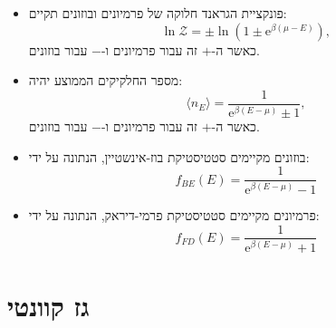 \documentclass{tstextbook}
\begin{document}
\begin{summary}
  \begin{itemize}
    \item פונקציית הגראנד חלוקה של פרמיונים ובוזונים תקיים:
$$\ln{\mathcal{Z}}=\pm\ln(1\pm\mathrm{e}^{\beta(\mu-E)}),$$
כאשר ה-\(+\) זה עבור פרמיונים ו-\(-\) עבור בוזונים.
    \item מספר החלקיקים הממוצע יהיה:
$$\langle n_{E}\rangle=\frac{1}{\mathrm{e}^{\beta(E-\mu)}\pm1},$$
כאשר ה-\(+\) זה עבור פרמיונים ו-\(-\) עבור בוזונים.
    \item בוזונים מקיימים סטטיסטיקת בוז-אינשטיין, הנתונה על ידי:
$$f_{BE}(E)=\frac{1}{\mathrm{e}^{\beta(E-\mu)}-1}$$
    \item פרמיונים מקיימים סטטיסטיקת פרמי-דיראק, הנתונה על ידי:
$$f_{FD}(E)=\frac{1}{\mathrm{e}^{\beta(E-\mu)}+1}$$
  \end{itemize}
\end{summary}
\section{גז קוונטי}
\end{document}
